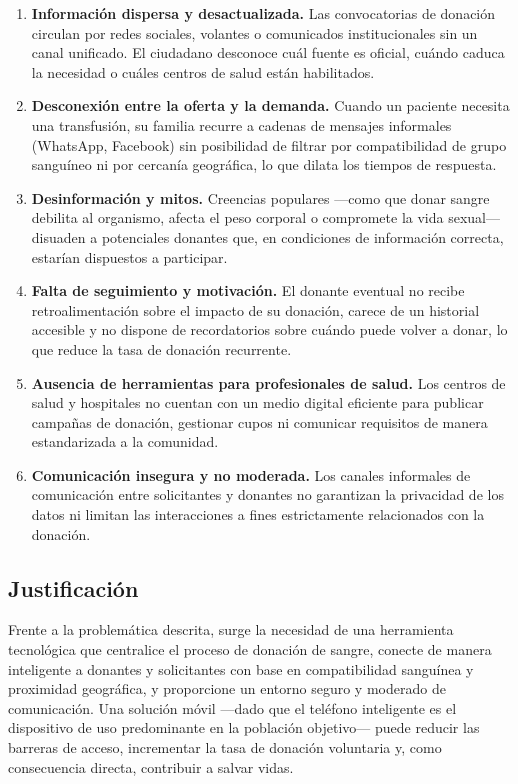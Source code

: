 \begin{enumerate}[label=\textbf{\arabic*.}, leftmargin=1.5cm]

    \item \textbf{Información dispersa y desactualizada.}
    Las convocatorias de donación circulan por redes sociales, volantes o comunicados institucionales sin un canal unificado. El ciudadano desconoce cuál fuente es oficial, cuándo caduca la necesidad o cuáles centros de salud están habilitados.

    \item \textbf{Desconexión entre la oferta y la demanda.}
    Cuando un paciente necesita una transfusión, su familia recurre a cadenas de mensajes informales (WhatsApp, Facebook) sin posibilidad de filtrar por compatibilidad de grupo sanguíneo ni por cercanía geográfica, lo que dilata los tiempos de respuesta.

    \item \textbf{Desinformación y mitos.}
    Creencias populares ---como que donar sangre debilita al organismo, afecta el peso corporal o compromete la vida sexual--- disuaden a potenciales donantes que, en condiciones de información correcta, estarían dispuestos a participar.

    \item \textbf{Falta de seguimiento y motivación.}
    El donante eventual no recibe retroalimentación sobre el impacto de su donación, carece de un historial accesible y no dispone de recordatorios sobre cuándo puede volver a donar, lo que reduce la tasa de donación recurrente.

    \item \textbf{Ausencia de herramientas para profesionales de salud.}
    Los centros de salud y hospitales no cuentan con un medio digital eficiente para publicar campañas de donación, gestionar cupos ni comunicar requisitos de manera estandarizada a la comunidad.

    \item \textbf{Comunicación insegura y no moderada.}
    Los canales informales de comunicación entre solicitantes y donantes no garantizan la privacidad de los datos ni limitan las interacciones a fines estrictamente relacionados con la donación.

\end{enumerate}

\subsection{Justificación}

Frente a la problemática descrita, surge la necesidad de una herramienta tecnológica que centralice el proceso de donación de sangre, conecte de manera inteligente a donantes y solicitantes con base en compatibilidad sanguínea y proximidad geográfica, y proporcione un entorno seguro y moderado de comunicación. Una solución móvil ---dado que el teléfono inteligente es el dispositivo de uso predominante en la población objetivo--- puede reducir las barreras de acceso, incrementar la tasa de donación voluntaria y, como consecuencia directa, contribuir a salvar vidas.
